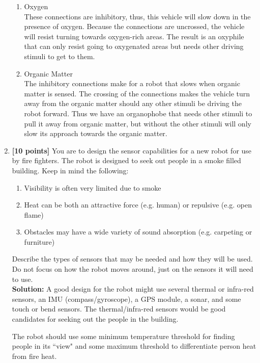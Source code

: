 \documentclass{article}
\begin{document}
\begin{enumerate}
\begin{enumerate}
    \item Oxygen \\
    These connections are inhibitory, thus, this vehicle will slow down in the presence of oxygen. Because the connections are uncrossed, the vehicle will resist turning towards oxygen-rich areas. The result is an oxyphile that can only resist going to oxygenated areas but needs other driving stimuli to get to them. 

    \item Organic Matter \\
    The inhibitory connections make for a robot that slows when organic matter is sensed. The crossing of the connections makes the vehicle turn away from the organic matter should any other stimuli be driving the robot forward. Thus we have an organophobe that needs other stimuli to pull it away from organic matter, but without the other stimuli will only slow its approach towards the organic matter.
    \end{enumerate}


\newpage
\item \textbf{[10 points]} You are to design the sensor capabilities for a new robot for use by fire fighters. The robot is designed to seek out people in a smoke filled building. Keep in mind the following:
    \begin{enumerate}
    \item Visibility is often very limited due to smoke

    \item Heat can be both an attractive force (e.g. human) or repulsive
          (e.g. open flame)

    \item Obstacles may have a wide variety of sound absorption (e.g.
          carpeting or furniture)
    \end{enumerate}

Describe the types of sensors that may be needed and how they will be used. Do not focus on how the robot moves around, just on the sensors it will need to use. \\

\textbf{Solution:} A good design for the robot might use several thermal or infra-red sensors, an IMU (compass/gyroscope), a GPS module, a sonar, and some touch or bend sensors. The thermal/infra-red sensors would be good candidates for seeking out the people in the building.

The robot should use some minimum temperature threshold for finding people in its ``view" and some maximum threshold to differentiate person heat from fire heat.


\end{enumerate}
\end{document}
